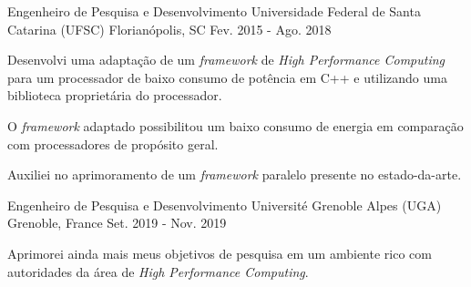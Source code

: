 

\begin{cventries}

  \cventry
    {Engenheiro de Pesquisa e Desenvolvimento} %
    {Universidade Federal de Santa Catarina (UFSC)} %
    {Florianópolis, SC} %
    {Fev. 2015 - Ago. 2018} %
    {
      \begin{cvitems} %
      \item {Desenvolvi uma adaptação de um \textit{framework} de \textit{High
        Performance Computing} para um processador de baixo consumo de potência
          em C++ e utilizando uma biblioteca proprietária do processador.}
        \item {O \textit{framework} adaptado possibilitou um baixo consumo de
          energia em comparação com processadores de propósito geral.}
        \item {Auxiliei no aprimoramento de um \textit{framework}
          paralelo presente no estado-da-arte.}
      \end{cvitems}
    }

  \cventry
    {Engenheiro de Pesquisa e Desenvolvimento} %
    {Université Grenoble Alpes (UGA)} %
    {Grenoble, France} %
    {Set. 2019 - Nov. 2019} %
    {
      \begin{cvitems} %
      \item {Aprimorei ainda mais meus objetivos de pesquisa em um ambiente rico
        com autoridades da área de \textit{High Performance Computing}.}
      \end{cvitems}
    }


\end{cventries}
